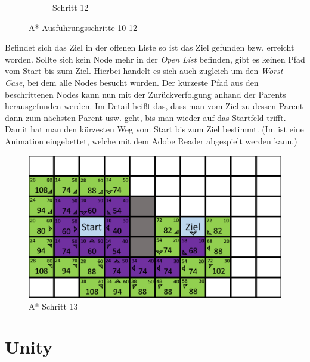\begin{figure}[H]
\begin{subfigure}[b]{0.3\textwidth}
        \caption{Schritt 12}
        \label{fig:aStartStep12}
    \end{subfigure}
    \caption{A* Ausführungsschritte 10-12}\label{fig:aStarStep10_12}
\end{figure}

Befindet sich das Ziel in der offenen Liste so ist das Ziel gefunden bzw. erreicht worden. Sollte sich kein Node mehr in der \textit{Open List} befinden, gibt es keinen Pfad vom Start bis zum Ziel. Hierbei handelt es sich auch zugleich um den \textit{Worst Case}, bei dem alle Nodes besucht wurden.
Der kürzeste Pfad aus den beschrittenen Nodes kann nun mit der Zurückverfolgung anhand der Parents herausgefunden werden. Im Detail hei\ss t das, dass man vom Ziel zu dessen Parent dann zum nächsten Parent usw. geht, bis man wieder auf das Startfeld trifft. Damit hat man den kürzesten Weg vom Start bis zum Ziel bestimmt. (Im  ist eine Animation eingebettet, welche mit dem Adobe Reader abgespielt werden kann.)  
\begin{figure}[H]
    \centering
    \includegraphics[width=\textwidth]{assets/aStarStep13.png}
    \caption{A* Schritt 13}\label{fig:aStarStep13}
\end{figure}
\section{Unity}

